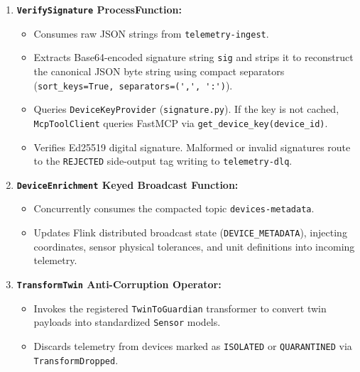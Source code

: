 \documentclass[10pt,a4paper]{report}
\begin{document}
\begin{enumerate}[leftmargin=*]
  \item \textbf{\texttt{VerifySignature} ProcessFunction:}
  \begin{itemize}
    \item Consumes raw JSON strings from \texttt{telemetry-ingest}.
    \item Extracts Base64-encoded signature string \texttt{sig} and strips it to reconstruct the canonical JSON byte string using compact separators (\lstinline{sort_keys=True, separators=(',', ':')}).
    \item Queries \texttt{DeviceKeyProvider} (\texttt{signature.py}). If the key is not cached, \texttt{McpToolClient} queries FastMCP via \lstinline{get_device_key(device_id)}.
    \item Verifies Ed25519 digital signature. Malformed or invalid signatures route to the \texttt{REJECTED} side-output tag writing to \texttt{telemetry-dlq}.
  \end{itemize}
  \item \textbf{\texttt{DeviceEnrichment} Keyed Broadcast Function:}
  \begin{itemize}
    \item Concurrently consumes the compacted topic \texttt{devices-metadata}.
    \item Updates Flink distributed broadcast state (\lstinline{DEVICE_METADATA}), injecting coordinates, sensor physical tolerances, and unit definitions into incoming telemetry.
  \end{itemize}
  \item \textbf{\texttt{TransformTwin} Anti-Corruption Operator:}
  \begin{itemize}
    \item Invokes the registered \texttt{TwinToGuardian} transformer to convert twin payloads into standardized \texttt{Sensor} models.
    \item Discards telemetry from devices marked as \texttt{ISOLATED} or \texttt{QUARANTINED} via \texttt{TransformDropped}.
  \end{itemize}
\end{enumerate}
\end{document}
